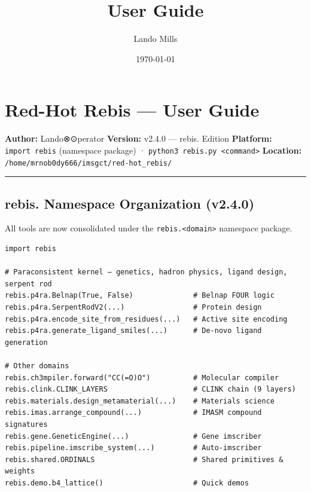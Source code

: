\documentclass[12pt,a4paper]{article}
\title{User Guide}
\date{\today}
\author{Lando Mills}
\begin{document}
\maketitle
\hypertarget{red-hot-rebis-user-guide}{%
\section{Red-Hot Rebis --- User Guide}\label{red-hot-rebis-user-guide}}

\textbf{Author:} Lando⊗⊙perator \textbf{Version:} v2.4.0 --- rebis.
Edition \textbf{Platform:} \texttt{import\ rebis} (namespace package) ·
\texttt{python3\ rebis.py\ \textless{}command\textgreater{}}
\textbf{Location:} \texttt{/home/mrnob0dy666/imsgct/red-hot\_rebis/}

\begin{center}\rule{0.5\linewidth}{0.5pt}\end{center}

\hypertarget{rebis.-namespace-organization-v2.4.0}{%
\subsection{rebis. Namespace Organization
(v2.4.0)}\label{rebis.-namespace-organization-v2.4.0}}

All tools are now consolidated under the
\texttt{rebis.\textless{}domain\textgreater{}} namespace package.

\begin{verbatim}
import rebis

# Paraconsistent kernel — genetics, hadron physics, ligand design, serpent rod
rebis.p4ra.Belnap(True, False)              # Belnap FOUR logic
rebis.p4ra.SerpentRodV2(...)                # Protein design
rebis.p4ra.encode_site_from_residues(...)   # Active site encoding
rebis.p4ra.generate_ligand_smiles(...)      # De-novo ligand generation

# Other domains
rebis.ch3mpiler.forward("CC(=O)O")          # Molecular compiler
rebis.clink.CLINK_LAYERS                    # CLINK chain (9 layers)
rebis.materials.design_metamaterial(...)    # Materials science
rebis.imas.arrange_compound(...)            # IMASM compound signatures
rebis.gene.GeneticEngine(...)               # Gene imscriber
rebis.pipeline.imscribe_system(...)         # Auto-imscriber
rebis.shared.ORDINALS                       # Shared primitives & weights
rebis.demo.b4_lattice()                     # Quick demos
\end{verbatim}
\end{document}
